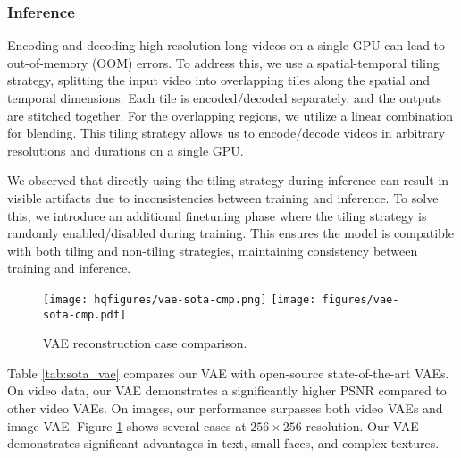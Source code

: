 \subsubsection{Inference}
Encoding and decoding high-resolution long videos on a single GPU can lead to out-of-memory (OOM) errors. To address this, we use a spatial-temporal tiling strategy, splitting the input video into overlapping tiles along the spatial and temporal dimensions. Each tile is encoded/decoded separately, and the outputs are stitched together. For the overlapping regions, we utilize a linear combination for blending. This tiling strategy allows us to encode/decode videos in arbitrary resolutions and durations on a single GPU.

We observed that directly using the tiling strategy during inference can result in visible artifacts due to inconsistencies between training and inference. To solve this, we introduce an additional finetuning phase where the tiling strategy is randomly enabled/disabled during training. This ensures the model is compatible with both tiling and non-tiling strategies, maintaining consistency between training and inference. 

\begin{figure}[ht]
    \centering
    \ifhq
    \texttt{[image: hqfigures/vae-sota-cmp.png]}
    \else
    \texttt{[image: figures/vae-sota-cmp.pdf]}
    \fi
    \caption{VAE reconstruction case comparison.}
    \label{fig:vae-sota-cmp}
\end{figure}

Table \ref{tab:sota_vae} compares our VAE with open-source state-of-the-art VAEs. On video data, our VAE demonstrates a significantly higher PSNR compared to other video VAEs. On images, our performance surpasses both video VAEs and image VAE. Figure \ref{fig:vae-sota-cmp} shows several cases at $256 \times 256$ resolution. Our VAE demonstrates significant advantages in text, small faces, and complex textures.



